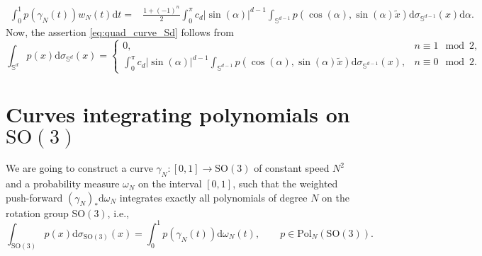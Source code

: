 \documentclass[%
a4paper,11pt,DIV=11,%
abstract=on%
]{scrartcl}
\begin{document}
\[
  \begin{aligned}
    \int_{0}^{1} p(\gamma_{N}(t)) w_{N}(t) \mathrm d t
   =  & \frac{1+(-1)^{n}}{2}\int_{0}^{\pi}  c_{d} |\sin(\alpha)|^{d-1} \int_{\mathbb S^{d-1}}  p(\cos(\alpha),\sin(\alpha)\tilde x) \mathrm d\sigma_{\mathbb S^{d-1}}(x) \mathrm d \alpha. 
  \end{aligned}
\]
Now, the assertion \eqref{eq:quad_curve_Sd} follows from 
\[
  \int_{\mathbb S^{d}} p(x) \mathrm d \sigma_{\mathbb S^{d}}(x) =
  \begin{cases}
    0, &  n \equiv 1 \mod 2,\\
  \int_{0}^{\pi}  c_{d} |\sin(\alpha)|^{d-1} \int_{\mathbb S^{d-1}}  p(\cos(\alpha),\sin(\alpha)\tilde x) \mathrm d\sigma_{\mathbb S^{d-1}}(x), & n \equiv 0 \mod 2.     
  \end{cases}
\]

\section{Curves integrating polynomials on $\mathrm{SO(3)}$} \label{sec:intro}

We are going to construct a curve $\gamma_{N}:[0,1] \to \mathrm{SO(3)}$ of constant speed $N^{2}$ and a probability measure $\omega_{N}$ on the interval $[0,1]$, such that the weighted push-forward $(\gamma_{N})_{*}\mathrm d \omega_{N}$ integrates exactly all polynomials of degree $N$ on the rotation group $\mathrm{SO(3)}$, i.e.,
\begin{equation}
   \label{eq:quad_curve_Sd}
  \int_{\mathrm{SO(3)}} p(x) \mathrm d\sigma_{\mathrm{SO(3)}}(x) = \int_{0}^{1} p(\gamma_{N}(t)) \mathrm d\omega_{N}(t), \qquad p \in \mathrm{Pol}_{N}(\mathrm{SO(3)}).
\end{equation}
\end{document}
